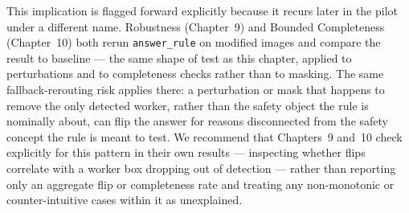 This implication is flagged forward explicitly because it recurs later in the pilot under a different
name. Robustness (Chapter~9) and Bounded Completeness (Chapter~10) both rerun \texttt{answer\_rule} on
modified images and compare the result to baseline --- the same shape of test as this chapter, applied
to perturbations and to completeness checks rather than to masking. The same fallback-rerouting risk
applies there: a perturbation or mask that happens to remove the only detected worker, rather than the
safety object the rule is nominally about, can flip the answer for reasons disconnected from the safety
concept the rule is meant to test. We recommend that Chapters~9 and~10 check explicitly for this
pattern in their own results --- inspecting whether flips correlate with a worker box dropping out of
detection --- rather than reporting only an aggregate flip or completeness rate and treating any
non-monotonic or counter-intuitive cases within it as unexplained.
